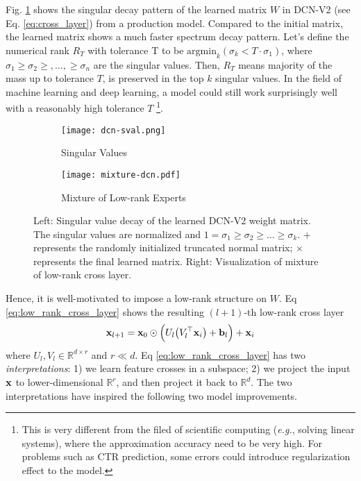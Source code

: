 \documentclass[sigconf]{acmart}
\newcommand{\vecx}{{\bf x}}
\newcommand{\vecb}{{\bf b}}
\begin{document}
Fig. \ref{fig:dcn-sval} shows the singular decay pattern of the learned matrix $W$ in {DCN-V2} (see Eq. \eqref{eq:cross_layer}) from a production model. Compared to the initial matrix, the learned matrix shows a much faster spectrum decay pattern. Let's define the numerical rank $R_T$ with tolerance T to be $\text{argmin}_k (\sigma_k < T \cdot \sigma_1)$, where $\sigma_1 \ge \sigma_2 \ge, \ldots, \ge \sigma_n$ are the singular values. Then, $R_T$ means majority of the mass up to tolerance $T$, is preserved in the top $k$ singular values. In the field of machine learning and deep learning, a model could still work surprisingly well with a reasonably high tolerance $T$ \footnote{This is very different from the filed of scientific computing (\emph{e.g.}, solving linear systems), where the approximation accuracy need to be very high. For problems such as CTR prediction, some errors could introduce regularization effect to the model.}.


\begin{figure}[htbp]
\centering
    \begin{subfigure}[b]{0.2\textwidth}  
    \texttt{[image: dcn-sval.png]}
    \caption{Singular Values}
    \label{fig:dcn-sval}
    \end{subfigure}
    \hfill
    \begin{subfigure}[b]{0.23\textwidth}  
    \texttt{[image: mixture-dcn.pdf]}
    \caption{Mixture of Low-rank Experts}
    \label{fig:mixture-dcn}
    \end{subfigure}
    \caption{Left: Singular value decay of the learned {DCN-V2} weight matrix. The singular values are normalized and $1 = \sigma_1 \ge \sigma_2 \ge \ldots \ge \sigma_k$. {\color{orange}$+$} represents the randomly initialized truncated normal matrix; {\color{blue}$\times$} represents the final learned matrix. Right: Visualization of mixture of low-rank cross layer.}
\end{figure}


Hence, it is well-motivated to impose a low-rank structure on $W$. Eq \eqref{eq:low_rank_cross_layer} shows the resulting $(l+1)$-th low-rank cross layer
\begin{equation}
\label{eq:low_rank_cross_layer}
	\vecx_{l+1} = \vecx_0 \odot \Big(U_l \big(V_l^\top \vecx_i\big) + \vecb_l \Big) + \vecx_i
\end{equation}
where $U_l, V_l \in \mathbb{R}^{d \times r}$ and $r \ll d$. Eq \eqref{eq:low_rank_cross_layer} has two \emph{interpretations}: 1) we learn feature crosses in a subspace; 2) we project the input $\vecx$ to lower-dimensional $\mathbb{R}^r$, and then project it back to $\mathbb{R}^d$. The two interpretations have inspired the following two model improvements.
\end{document}
